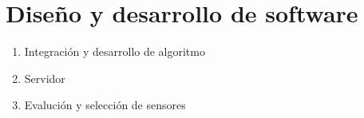 \chapter{Diseño y desarrollo de software}

\begin{enumerate}
    \item Integración y desarrollo de algoritmo
    \item Servidor
    \item Evalución y selección de sensores
\end{enumerate}